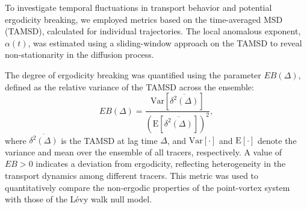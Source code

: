 \documentclass[]{article}
\begin{document}
To investigate temporal fluctuations in transport behavior and potential ergodicity breaking, we employed metrics based on the time-averaged MSD (TAMSD), calculated for individual trajectories. The local anomalous exponent, $\alpha(t)$, was estimated using a sliding-window approach on the TAMSD to reveal non-stationarity in the diffusion process.

The degree of ergodicity breaking was quantified using the parameter $EB(\Delta)$, defined as the relative variance of the TAMSD across the ensemble:
\begin{equation}
EB(\Delta) = \frac{\text{Var}[\overline{\delta^2(\Delta)}]}{(\text{E}[\overline{\delta^2(\Delta)}])^2},
\end{equation}
where $\overline{\delta^2(\Delta)}$ is the TAMSD at lag time $\Delta$, and $\text{Var}[\cdot]$ and $\text{E}[\cdot]$ denote the variance and mean over the ensemble of all tracers, respectively. A value of $EB > 0$ indicates a deviation from ergodicity, reflecting heterogeneity in the transport dynamics among different tracers. This metric was used to quantitatively compare the non-ergodic properties of the point-vortex system with those of the L\'evy walk null model.
\end{document}

